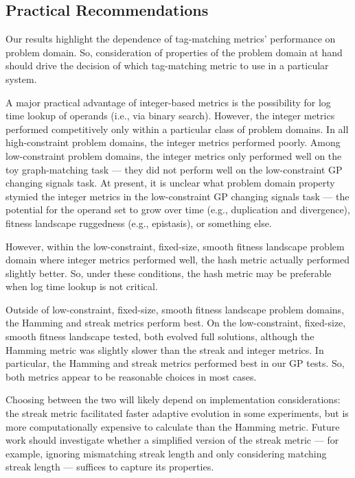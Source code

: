 \subsection{Practical Recommendations}

Our results highlight the dependence of tag-matching metrics' performance on  problem domain.
So, consideration of properties of the problem domain at hand should drive the decision of which tag-matching metric to use in a particular system.

A major practical advantage of integer-based metrics is the possibility for log time lookup of operands (i.e., via binary search).
However, the integer metrics performed competitively only within a particular class of problem domains.
In all high-constraint problem domains, the integer metrics performed poorly.
Among low-constraint problem domains, the integer metrics only performed well on the toy graph-matching task --- they did not perform well on the low-constraint GP changing signals task.
At present, it is unclear what problem domain property stymied the integer metrics in the low-constraint GP changing signals task --- the potential for the operand set to grow over time (e.g., duplication and divergence), fitness landscape ruggedness (e.g., epistasis), or something else.

However, within the low-constraint, fixed-size, smooth fitness landscape problem domain where integer metrics performed well, the hash metric actually performed slightly better.
So, under these conditions, the hash metric may be preferable when log time lookup is not critical.

Outside of low-constraint, fixed-size, smooth fitness landscape problem domains, the Hamming and streak metrics perform best.
On the low-constraint, fixed-size, smooth fitness landscape tested, both evolved full solutions, although the Hamming metric was slightly slower than the streak and integer metrics.
In particular, the Hamming and streak metrics performed best in our GP tests.
So, both metrics appear to be reasonable choices in most cases.

Choosing between the two will likely depend on implementation considerations: the streak metric facilitated faster adaptive evolution in some experiments, but is more computationally expensive to calculate than the Hamming metric.
Future work should investigate whether a simplified version of the streak metric --- for example, ignoring mismatching streak length and only considering matching streak length --- suffices to capture its properties.
